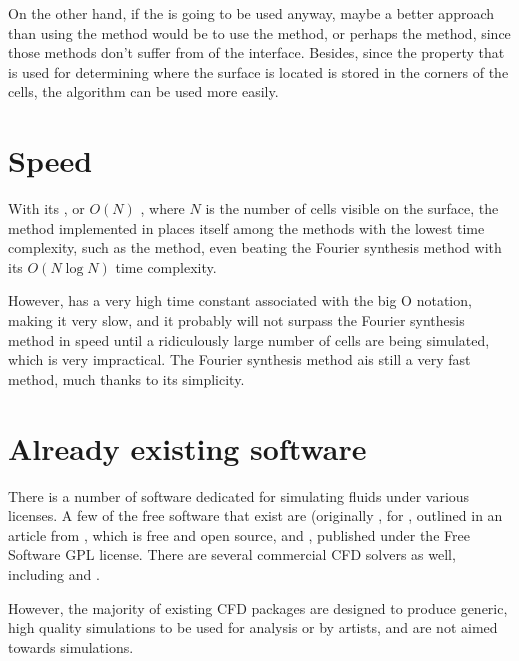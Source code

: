 On the other hand, if the \FVM is going to be used anyway, maybe a better approach than using the \VOF method would be to use the \LS method, or perhaps the \CLSVOF method, since those methods don't suffer from \diffusion of the interface. Besides, since the property that is used for determining where the surface is located is stored in the corners of the cells, the  algorithm can be used more easily.

\section{Speed}

With its , or $O(N)$ , where $N$ is the number of cells visible on the surface, the method implemented in \thisprojectwork places itself among the methods with the lowest time complexity, such as the \LPD method, even beating the Fourier synthesis method with its $O(N \log N)$ time complexity.

However, \thismethod has a very high time constant associated with the big O notation, making it very slow, and it probably will not surpass the Fourier synthesis method in speed until a ridiculously large number of cells are being simulated, which is very impractical. The Fourier synthesis method ais still a very fast method, much thanks to its simplicity.

\section{Already existing software}

There is a number of software dedicated for simulating fluids under various licenses. A few of the free software  that exist are \OpenFOAM (originally , for \textit{}, outlined in an article from \citeyear{Weller1998} \citep{Weller1998}, which is free and open source, and \Gerris \citep{Popinet2003}, published under the Free Software GPL license. There are several commercial CFD solvers as well, including \RealFlow and . %

However, the majority of existing CFD packages are designed to produce generic, high quality simulations to be used for analysis or by artists, and are not aimed towards \realtime simulations.
